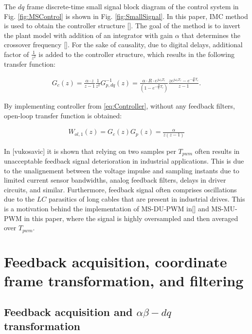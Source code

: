 \documentclass[journal]{IEEEtran}
\begin{document}
The $dq$ frame discrete-time small signal block diagram of the control system in Fig. \ref{fig:MSControl} is shown in Fig. \ref{fig:SmallSignal}. In this paper, IMC method is used to obtain the controller structure []. The goal of the method is to invert the plant model with addition of an integrator with gain $\alpha$ that determines the crossover frequency []. For the sake of causality, due to digital delays, additional factor of $\frac{1}{z^2}$ is added to the controller structure, which results in the following transfer function:

\begin{equation}
\begin{aligned}
G_{c}(z) =  \frac{\alpha \cdot z}{z-1} \frac{1}{z^2} G^{-1}_{p,dq}(z)  =   \frac{\alpha \cdot R \cdot e^{j\omega_o T_c}}{\left( 1 - e^{-\frac{R}{L}T_c}\right)}\frac{z e^{j\omega_o T_c}-e^{-\frac{R}{L}T_c}}{z-1}.
\label{eq:Controller} 
\end{aligned}    
\end{equation}

By implementing controller from \eqref{eq:Controller}, without any feedback filters, open-loop transfer function is obtained:

\begin{equation}
\begin{aligned}
W_{ol,1}(z) = G_c(z) G_p(z) =  \frac{\alpha}{z(z-1)}
\label{eq:OpenLoop} 
\end{aligned}    
\end{equation}

In [vukosavic] it is shown that relying on two samples per $T_{pwm}$ often results in unacceptable feedback signal deterioration in industrial applications. This is due to the unalignement between the voltage impulse and sampling instants due to limited current sensor bandwidths, analog feedback filters, delays in driver circuits, and similar. Furthermore, feedback signal often comprises oscillations due to the $LC$ parasitics of long cables that are present in industrial drives. This is a motivation behind the implementation of MS-DU-PWM in[] and MS-MU-PWM in this paper, where the signal is highly oversampled and then averaged over $T_{pwm}$.

\section{Feedback acquisition, coordinate frame transformation, and filtering}

\subsection{Feedback acquisition and $\alpha \beta - dq$ transformation}
\end{document}
